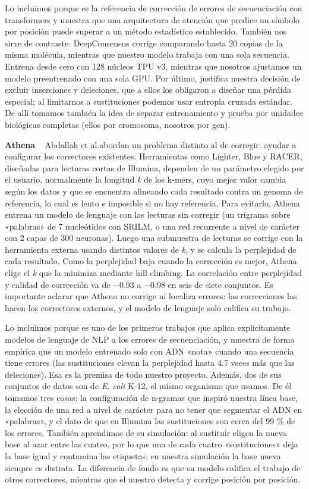 \documentclass[sigconf,nonacm]{acmart}
\begin{document}
Lo incluimos porque es la referencia de corrección de errores de secuenciación con transformers y muestra que una arquitectura de atención que predice un símbolo por posición puede superar a un método estadístico establecido. También nos sirve de contraste: DeepConsensus corrige comparando hasta 20 copias de la misma molécula, mientras que nuestro modelo trabaja con una sola secuencia. Entrena desde cero con 128 núcleos TPU v3, mientras que nosotros ajustamos un modelo preentrenado con una sola GPU. Por último, justifica nuestra decisión de excluir inserciones y deleciones, que a ellos los obligaron a diseñar una pérdida especial; al limitarnos a sustituciones podemos usar entropía cruzada estándar. De allí tomamos también la idea de separar entrenamiento y prueba por unidades biológicas completas (ellos por cromosoma, nosotros por gen).

\textbf{Athena} ~\cite{abdallah2019athena} Abdallah et al.abordan un problema distinto al de corregir: ayudar a configurar los correctores existentes. Herramientas como Lighter, Blue y RACER, diseñadas para lecturas cortas de Illumina, dependen de un parámetro elegido por el usuario, normalmente la longitud \emph{k} de los k-mers, cuyo mejor valor cambia según los datos y que se encuentra alineando cada resultado contra un genoma de referencia, lo cual es lento e imposible si no hay referencia. Para evitarlo, Athena entrena un modelo de lenguaje con las lecturas sin corregir (un trigrama sobre «palabras» de 7 nucleótidos con SRILM, o una red recurrente a nivel de carácter con 2 capas de 300 neuronas). Luego una submuestra de lecturas se corrige con la herramienta externa usando distintos valores de \emph{k}, y se calcula la perplejidad de cada resultado. Como la perplejidad baja cuando la corrección es mejor, Athena elige el \emph{k} que la minimiza mediante hill climbing. La correlación entre perplejidad y calidad de corrección va de −0.93 a −0.98 en seis de siete conjuntos. Es importante aclarar que Athena no corrige ni localiza errores: las correcciones las hacen los correctores externos, y el modelo de lenguaje solo califica su trabajo.

Lo incluimos porque es uno de los primeros trabajos que aplica explícitamente modelos de lenguaje de NLP a los errores de secuenciación, y muestra de forma empírica que un modelo entrenado solo con ADN «nota» cuando una secuencia tiene errores (las sustituciones elevan la perplejidad hasta 4.7 veces más que las deleciones). Esa es la premisa de todo nuestro proyecto. Además, dos de sus conjuntos de datos son de \emph{E. coli} K-12, el mismo organismo que usamos. De él tomamos tres cosas: la configuración de n-gramas que inspiró nuestra línea base, la elección de una red a nivel de carácter para no tener que segmentar el ADN en «palabras», y el dato de que en Illumina las sustituciones son cerca del 99 \% de los errores. También aprendimos de su simulación: al sustituir eligen la nueva base al azar entre las cuatro, por lo que una de cada cuatro «sustituciones» deja la base igual y contamina las etiquetas; en nuestra simulación la base nueva siempre es distinta. La diferencia de fondo es que su modelo califica el trabajo de otros correctores, mientras que el nuestro detecta y corrige posición por posición.
\end{document}
